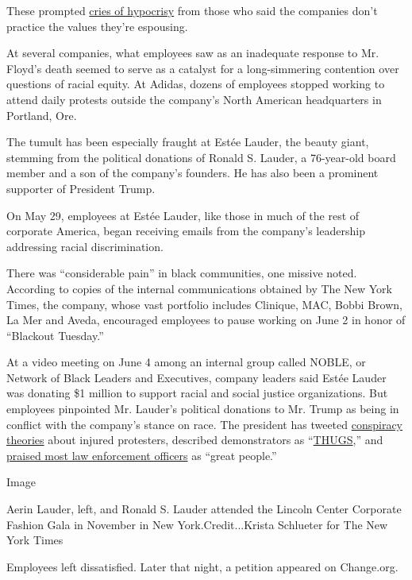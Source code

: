 These prompted
\href{https://www.nytimes.com/2020/06/06/business/corporate-america-has-failed-black-america.html?searchResultPosition=1}{cries
of hypocrisy} from those who said the companies don't practice the
values they're espousing.

At several companies, what employees saw as an inadequate response to
Mr. Floyd's death seemed to serve as a catalyst for a long-simmering
contention over questions of racial equity. At Adidas, dozens of
employees stopped working to attend daily protests outside the company's
North American headquarters in Portland, Ore.

The tumult has been especially fraught at Estée Lauder, the beauty
giant, stemming from the political donations of Ronald S. Lauder, a
76-year-old board member and a son of the company's founders. He has
also been a prominent supporter of President Trump.

On May 29, employees at Estée Lauder, like those in much of the rest of
corporate America, began receiving emails from the company's leadership
addressing racial discrimination.

There was ``considerable pain'' in black communities, one missive noted.
According to copies of the internal communications obtained by The New
York Times, the company, whose vast portfolio includes Clinique, MAC,
Bobbi Brown, La Mer and Aveda, encouraged employees to pause working on
June 2 in honor of ``Blackout Tuesday.''

At a video meeting on June 4 among an internal group called NOBLE, or
Network of Black Leaders and Executives, company leaders said Estée
Lauder was donating \$1 million to support racial and social justice
organizations. But employees pinpointed Mr. Lauder's political donations
to Mr. Trump as being in conflict with the company's stance on race. The
president has tweeted
\href{https://www.nytimes.com/2020/06/09/nyregion/who-is-martin-gugino-buffalo-police.html}{conspiracy
theories} about injured protesters, described demonstrators as
``\href{https://twitter.com/realDonaldTrump/status/1266231100780744704?s=20}{THUGS},''
and
\href{https://www.nytimes.com/2020/06/08/us/politics/defund-police-trump.html}{praised
most law enforcement officers} as ``great people.''

Image

Aerin Lauder, left, and Ronald S. Lauder attended the Lincoln Center
Corporate Fashion Gala in November in New York.Credit...Krista Schlueter
for The New York Times

Employees left dissatisfied. Later that night, a petition appeared on
Change.org.

